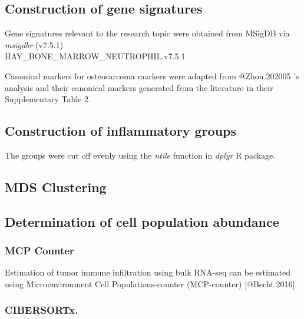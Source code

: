 \documentclass[
]{article}
\begin{document}
\hypertarget{construction-of-gene-signatures}{%
\subsection{Construction of gene
signatures}\label{construction-of-gene-signatures}}

Gene signatures relevant to the research topic were obtained from MSigDB
via \emph{msigdbr} (v7.5.1)\\
HAY\_BONE\_MARROW\_NEUTROPHIL.v7.5.1

Canonical markers for osteosarcoma markers were adapted from
@Zhou.202005 's analysis and their canonical markers generated from the
literature in their Supplementary Table 2.

\hypertarget{construction-of-inflammatory-groups}{%
\subsection{Construction of inflammatory
groups}\label{construction-of-inflammatory-groups}}

The groups were cut off evenly using the \emph{ntile} function in
\emph{dplyr} R package.

\hypertarget{mds-clustering}{%
\subsection{MDS Clustering}\label{mds-clustering}}

\hypertarget{determination-of-cell-population-abundance}{%
\subsection{Determination of cell population
abundance}\label{determination-of-cell-population-abundance}}

\hypertarget{mcp-counter}{%
\subsubsection{MCP Counter}\label{mcp-counter}}

Estimation of tumor immune infiltration using bulk RNA-seq can be
estimated using Microenvironment Cell Populations-counter (MCP-counter)
{[}@Becht.2016{]}.

\hypertarget{cibersortx.}{%
\subsubsection{CIBERSORTx.}\label{cibersortx.}}
\end{document}
